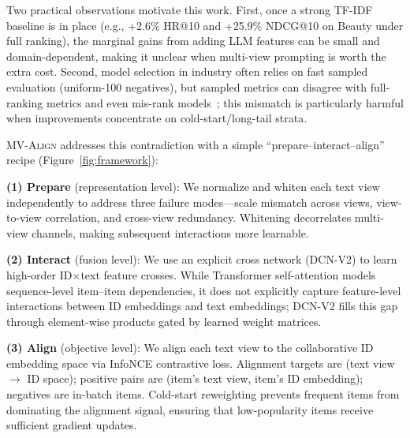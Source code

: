 \documentclass[sigconf,natbib=true,anonymous]{acmart}
\newcommand{\model}{\textsc{MV-Align}\xspace}
\newcommand{\tfidf}{\textsc{TF-IDF}\xspace}
\newcommand{\llm}{\textsc{LLM}\xspace}
\begin{document}
Two practical observations motivate this work. First, once a
strong \tfidf baseline is in place (e.g., +2.6\% HR@10 and
+25.9\% NDCG@10 on Beauty under full ranking), the marginal
gains from adding \llm features can be small and domain-dependent,
making it unclear when multi-view prompting is worth the extra
cost. Second, model selection in industry often relies on fast
sampled evaluation (uniform-100 negatives), but
sampled metrics can disagree with full-ranking metrics and even
mis-rank models~\cite{krichene2020sampledmetrics}; this mismatch
is particularly harmful when improvements concentrate on
cold-start/long-tail strata.

\model addresses this contradiction with a simple
``prepare--interact--align'' recipe (Figure~\ref{fig:framework}):

\textbf{(1) Prepare} (representation level): We normalize
and whiten each text view independently to address three failure
modes---scale mismatch across views, view-to-view correlation,
and cross-view redundancy. Whitening decorrelates multi-view
channels, making subsequent interactions more learnable.

\textbf{(2) Interact} (fusion level): We use an explicit cross
network (DCN-V2) to learn high-order ID$\times$text feature
crosses. While Transformer self-attention models sequence-level
item--item dependencies, it does not explicitly capture
feature-level interactions between ID embeddings and text
embeddings; DCN-V2 fills this gap through element-wise products
gated by learned weight matrices.

\textbf{(3) Align} (objective level): We align each text view
to the collaborative ID embedding space via InfoNCE contrastive
loss. Alignment targets are (text view $\to$ ID space); positive
pairs are (item's text view, item's ID embedding); negatives are
in-batch items. Cold-start reweighting prevents frequent items
from dominating the alignment signal, ensuring that
low-popularity items receive sufficient gradient updates.
\end{document}
